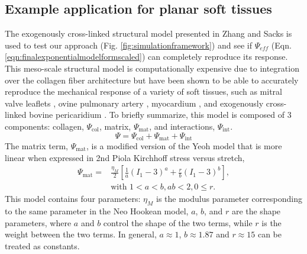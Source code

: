 
\subsection{Example application for planar soft tissues}

	The exogenously cross-linked structural model presented in Zhang and Sacks \cite{zhang_modeling_2017} is used to test our approach (Fig. \ref{fig:simulationframework}) and see if $\Psi_{eff}$ (Eqn. \ref{eqn:finalexponentialmodelformscaled}) can completely reproduce its response. This meso-scale structural model is computationally expensive due to integration over the collagen fiber architecture but have been shown to be able to accurately reproduce the mechanical response of a variety of soft tissues, such as mitral valve leaflets \cite{zhang_meso_2016}, ovine pulmonary artery \cite{fata_insights_2014}, myocardium \cite{avazmohammadi_novel_2017}, and exogenously cross-linked bovine pericaridium \cite{sacks_novel_2016}. To briefly summarize, this model is composed of 3 components: collagen, $\Psi_\mathrm{col}$, matrix, $\Psi_\mathrm{mat}$, and interactions, $\Psi_\mathrm{int}$. 
\begin{equation}
\Psi 	= \Psi_\mathrm{col} + \Psi_\mathrm{mat} + \Psi_\mathrm{int} \label{eqn:structuralmodelcomponents}
\end{equation}
    The matrix term, $\Psi_\mathrm{mat}$, is a modified version of the Yeoh model that is more linear when expressed in 2nd Piola Kirchhoff stress versus stretch, 
\begin{equation}\label{eqn:matrixmodel}
\begin{aligned}
\Psi_\mathrm{mat} = &\frac{\eta_M}{2} \left[ \frac{1}{a}\left( I_1 -3\right)^{a} + \frac{r}{b} \left( I_1 -3\right)^{b} \right], \\
&\text{with } 1<a<b, ab <2, 0 \leq r.
\end{aligned}
\end{equation}
    This model contains four parameters: $\eta_M$ is the modulus parameter corresponding to the same parameter in the Neo Hookean model, $a$, $b$, and $r$ are the shape parameters, where $a$ and $b$ control the shape of the two terms, while $r$ is the weight between the two terms. In general, $a \approx 1$, $b \approx 1.87$ and $r \approx 15$ can be treated as constants. 


